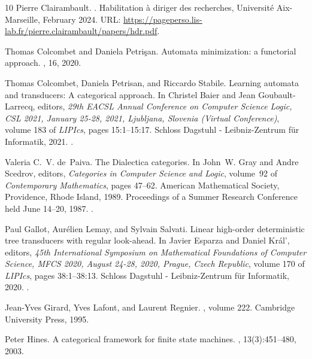 \documentclass[10pt,a4paper]{amsart}
\numberwithin{equation}{section}
\theoremstyle{plain}
\begin{document}
\begin{thebibliography}{10}
Pierre Clairambault.
.
\newblock Habilitation à diriger des recherches, {Université Aix-Marseille},
  February 2024.
\newblock URL:
  \url{https://pageperso.lis-lab.fr/pierre.clairambault/papers/hdr.pdf}.

Thomas Colcombet and Daniela Petri{\c{s}}an.
\newblock Automata minimization: a functorial approach.
, 16, 2020.

Thomas Colcombet, Daniela Petrisan, and Riccardo Stabile.
\newblock Learning automata and transducers: {A} categorical approach.
\newblock In Christel Baier and Jean Goubault{-}Larrecq, editors, {\em 29th
  {EACSL} Annual Conference on Computer Science Logic, {CSL} 2021, January
  25-28, 2021, Ljubljana, Slovenia (Virtual Conference)}, volume 183 of {\em
  LIPIcs}, pages 15:1--15:17. Schloss Dagstuhl - Leibniz-Zentrum f{\"{u}}r
  Informatik, 2021.
\newblock \href {https://doi.org/10.4230/LIPICS.CSL.2021.15}
  {}.

Valeria C.~V. de~Paiva.
\newblock The {Dialectica} categories.
\newblock In John~W. Gray and Andre Scedrov, editors, {\em Categories in
  Computer Science and Logic}, volume~92 of {\em Contemporary Mathematics},
  pages 47--62. American Mathematical Society, Providence, Rhode Island, 1989.
\newblock Proceedings of a Summer Research Conference held June 14--20, 1987.
\newblock \href {https://doi.org/10.1090/conm/092/1003194}
  {}.

Paul Gallot, Aurélien Lemay, and Sylvain Salvati.
\newblock Linear high-order deterministic tree transducers with regular
  look-ahead.
\newblock In Javier Esparza and Daniel Kr{\'{a}}l', editors, {\em 45th
  International Symposium on Mathematical Foundations of Computer Science,
  {MFCS} 2020, August 24-28, 2020, Prague, Czech Republic}, volume 170 of {\em
  LIPIcs}, pages 38:1--38:13. Schloss Dagstuhl - Leibniz-Zentrum für
  Informatik, 2020.
\newblock \href {https://doi.org/10.4230/LIPIcs.MFCS.2020.38}
  {}.

Jean-Yves Girard, Yves Lafont, and Laurent Regnier.
, volume 222.
\newblock Cambridge University Press, 1995.

Peter Hines.
\newblock A categorical framework for finite state machines.
, 13(3):451--480,
  2003.


\end{thebibliography}
\end{document}
